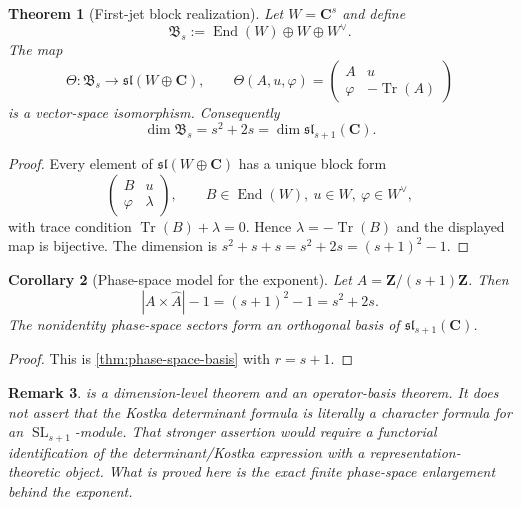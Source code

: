 \documentclass[11pt]{article}
\newcommand{\C}{\mathbf C}
\newcommand{\Z}{\mathbf Z}
\newcommand{\Tr}{\operatorname{Tr}}
\newcommand{\End}{\operatorname{End}}
\newcommand{\SL}{\operatorname{SL}}
\newcommand{\1}{\mathbf 1}
\newtheorem{theorem}{Theorem}[section]
\newtheorem{corollary}[theorem]{Corollary}
\newtheorem{remark}[theorem]{Remark}
\numberwithin{equation}{section}
\begin{document}
\begin{theorem}[First-jet block realization]\label{thm:first-jet-block}
Let $W=\C^s$ and define
\begin{equation}
  \mathfrak B_s:=\End(W)\oplus W\oplus W^\vee.
\end{equation}
The map
\begin{equation}
  \Theta:\mathfrak B_s\to\mathfrak{sl}(W\oplus\C),
  \qquad
  \Theta(A,u,\varphi)=
  \begin{pmatrix}
    A & u\\
    \varphi & -\Tr(A)
  \end{pmatrix}
\end{equation}
is a vector-space isomorphism.  Consequently
\begin{equation}
  \dim\mathfrak B_s=s^2+2s=\dim\mathfrak{sl}_{s+1}(\C).
\end{equation}
\end{theorem}

\begin{proof}
Every element of $\mathfrak{sl}(W\oplus\C)$ has a unique block form
\begin{equation}
  \begin{pmatrix}
    B & u\\
    \varphi & \lambda
  \end{pmatrix},
  \qquad
  B\in\End(W),\ u\in W,
  \ \varphi\in W^\vee,
\end{equation}
with trace condition $\Tr(B)+\lambda=0$.  Hence $\lambda=-\Tr(B)$ and the displayed map is bijective.  The dimension is $s^2+s+s=s^2+2s=(s+1)^2-1$.
\end{proof}

\begin{corollary}[Phase-space model for the exponent]\label{cor:CUE-phase-exponent}
Let $A=\Z/(s+1)\Z$.  Then
\begin{equation}
  |A\times\widehat A|-1=(s+1)^2-1=s^2+2s.
\end{equation}
The nonidentity phase-space sectors form an orthogonal basis of $\mathfrak{sl}_{s+1}(\C)$.
\end{corollary}

\begin{proof}
This is \cref{thm:phase-space-basis} with $r=s+1$.
\end{proof}

\begin{remark}
 is a dimension-level theorem and an operator-basis theorem.  It does not assert that the Kostka determinant formula is literally a character formula for an $\SL_{s+1}$-module.  That stronger assertion would require a functorial identification of the determinant/Kostka expression with a representation-theoretic object.  What is proved here is the exact finite phase-space enlargement behind the exponent.
\end{remark}
\end{document}
